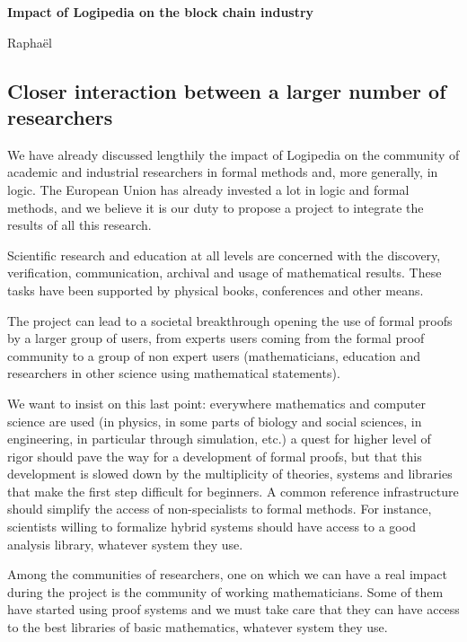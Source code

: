 \begin{framed}
{\bf \Large Impact of Logipedia on the block chain industry}

{\color{red} Raphaël}  
\end{framed}

\subsection{Closer interaction between a larger number of researchers}

We have already discussed lengthily the impact of Logipedia on the
community of academic and industrial researchers in formal methods
and, more generally, in logic.
The European Union has already invested a lot in logic and formal
methods, and we believe it is our duty to propose a project to
integrate the results of all this research.

Scientific research and education at all levels are concerned with the
discovery, verification, communication, archival and usage of
mathematical results.  These tasks have been supported by physical
books, conferences and other means.

The project can lead to a societal breakthrough opening the use of
formal proofs by a larger group of users, from experts users coming
from the formal proof community to a group of non expert users
(mathematicians, education and researchers in other science using
mathematical statements).

We want to insist on this last point: everywhere mathematics and
computer science are used (in physics, in some parts of biology and
social sciences, in engineering, in particular through simulation,
etc.) a quest for higher level of rigor should pave the way for a
development of formal proofs, but that this development is slowed down
by the multiplicity of theories, systems and libraries that make the
first step difficult for beginners. A common reference infrastructure
should simplify the access of non-specialists to formal methods.  For
instance, scientists willing to formalize hybrid systems should have
access to a good analysis library, whatever system they use.

Among the communities of researchers, one on which we can have a real
impact during the project is the community of working mathematicians.
Some of them have started using proof systems and we must take care that they
can have access to the best libraries of basic mathematics, whatever system
they use.


